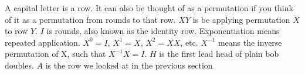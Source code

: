 \documentclass[preview]{standalone}
\begin{document}
\begin{flushleft}
A capital letter is a row. It can also be thought of as a permutation if you think of it as a permutation from rounds to that row. $XY$ is be applying permutation $X$ to row $Y$. $I$ is rounds, also known as the identity row. Exponentiation means repeated application. $X^0=I$, $X^1=X$, $X^2=XX$, etc. $X^{-1}$ means the inverse permutation of X, such that $X^{-1}X=I$. $H$ is the first lead head of plain bob doubles. $A$ is the row we looked at in the previous section
\end{flushleft}
\end{document}

